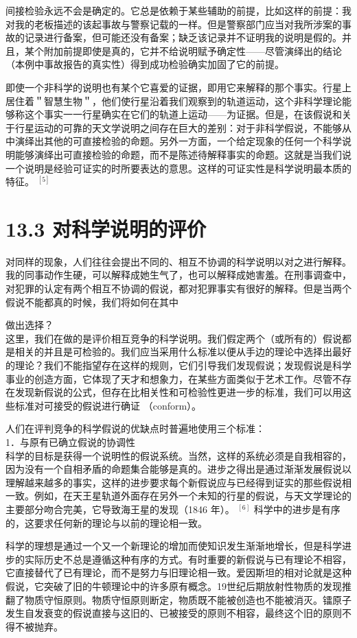 间接检验永远不会是确定的。它总是依赖于某些辅助的前提，比如这样的前提：我对我的老板描述的该起事故与警察记载的一样。但是警察部门应当对我所涉案的事故的记录进行备案，但可能还没有备案；缺乏该记录并不证明我的说明是假的。并且，某个附加前提即使是真的，它并不给说明赋予确定性——尽管演绎出的结论（本例中事故报告的真实性）得到成功检验确实加固了它的前提。

即使一个非科学的说明也有某个它喜爱的证据，即用它来解释的那个事实。行星上居住着＂智慧生物＂，他们使行星沿着我们观察到的轨道运动，这个非科学理论能够称这个事实一一行星确实在它们的轨道上运动——为证据。但是，在该假说和关于行星运动的可靠的天文学说明之间存在巨大的差别：对于非科学假说，不能够从中演绎出其他的可直接检验的命题。另外一方面，一个给定现象的任何一个科学说明能够演绎出可直接检验的命题，而不是陈述待解释事实的命题。这就是当我们说一个说明是经验可证实的时所要表达的意思。这样的可证实性是科学说明最本质的特征。 ${ }^{[5]}$

\section*{13.3 对科学说明的评价}
对同样的现象，人们往往会提出不同的、相互不协调的科学说明以对之进行解释。我的同事动作生硬，可以解释成她生气了，也可以解释成她害羞。在刑事调查中，对犯罪的认定有两个相互不协调的假说，都对犯罪事实有很好的解释。但是当两个假说不能都真的时候，我们将如何在其中

做出选择？\\
这里，我们在做的是评价相互竞争的科学说明。我们假定两个（或所有的）假说都是相关的并且是可检验的。我们应当采用什么标准以便从手边的理论中选择出最好的理论？我们不能指望存在这样的规则，它们引导我们发现假说；发现假说是科学事业的创造方面，它体现了天才和想象力，在某些方面类似于艺术工作。尽管不存在发现新假说的公式，但存在比相关性和可检验性更进一步的标准，我们可以用这些标准对可接受的假说进行确证 （conform）。

人们在评判竞争的科学假说的优缺点时普遍地使用三个标准：\\
1．与原有已确立假说的协调性\\
科学的目标是获得一个说明性的假说系统。当然，这样的系统必须是自我相容的，因为没有一个自相矛盾的命题集合能够是真的。进步之得出是通过渐渐发展假说以理解越来越多的事实，这样的进步要求每个新假说应与已经得到证实的那些假说相一致。例如，在天王星轨道外面存在另外一个未知的行星的假说，与天文学理论的主要部分吻合完美，它导致海王星的发现（1846 年）。 ${ }^{[6]}$ 科学中的进步是有序的，这要求任何新的理论与以前的理论相一致。

科学的理想是通过一个又一个新理论的增加而使知识发生渐渐地增长，但是科学进步的实际历史不总是遵循这种有序的方式。有时重要的新假说与已有理论不相容，它直接替代了已有理论，而不是努力与旧理论相一致。爱因斯坦的相对论就是这种假说，它突破了旧的牛顿理论中的许多原有概念。19世纪后期放射性物质的发现推翻了物质守恒原则。物质守恒原则断定，物质既不能被创造也不能被消灭。镭原子发生自发衰变的假说直接与这旧的、已被接受的原则不相容，最终这个旧的原则不得不被抛弃。


